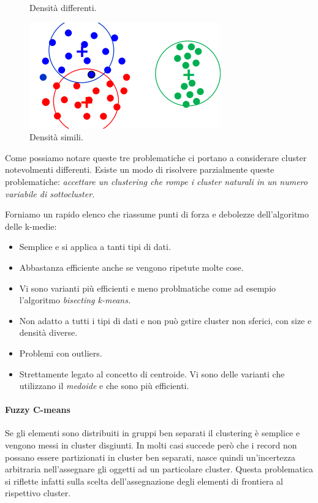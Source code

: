 \begin{itemize}
\begin{figure}[H]
\begin{minipage}[b]{0.30\textwidth}
			\caption{Densità differenti.}
		\end{minipage}
		\hfill
		\begin{minipage}[b]{0.30\textwidth}
			\centering
			\includegraphics[width=\textwidth]{clustering/pict/densita_2.png}
			\caption{Densità simili.}
		\end{minipage}
	\end{figure}
\end{itemize}
Come possiamo notare queste tre problematiche ci portano a considerare cluster notevolmenti differenti. Esiste un modo di risolvere parzialmente queste problematiche: \textit{accettare un clustering che rompe i cluster naturali in un numero variabile di sottocluster.}

Forniamo un rapido elenco che riassume punti di forza e debolezze dell'algoritmo delle k-medie:
\begin{itemize}
	\item Semplice e si applica a tanti tipi di dati.
	\item Abbastanza efficiente anche se vengono ripetute molte cose.
	\item Vi sono varianti più efficienti e meno problmatiche come ad esempio l'algoritmo \textit{bisecting k-means.}
	\item Non adatto a tutti i tipi di dati e non può gstire cluster non sferici, con size e densità diverse.
	\item Problemi con outliers.
	\item Strettamente legato al concetto di centroide. Vi sono delle varianti che utilizzano il \textit{medoide} e che sono più efficienti.
	
	
\end{itemize}

\paragraph{Fuzzy C-means}
Se gli elementi sono distribuiti in gruppi ben separati il clustering è semplice e vengono messi in cluster disgiunti. In molti casi succede però che i record non possano essere partizionati in cluster ben separati, nasce quindi un'incertezza arbitraria nell'assegnare gli oggetti ad un particolare cluster. Questa problematica si riflette infatti sulla scelta dell'assegnazione degli elementi di frontiera al rispettivo cluster.

